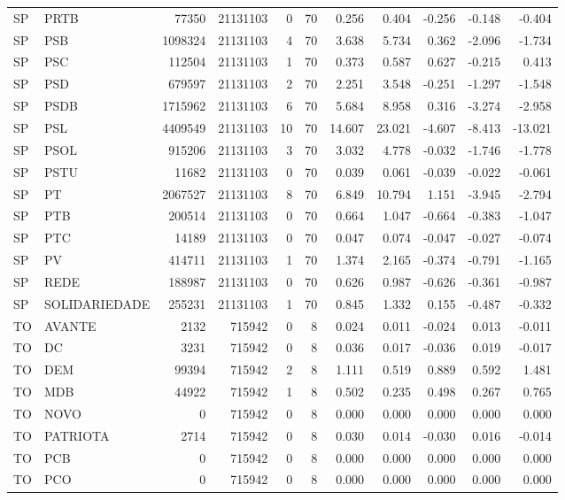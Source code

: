 \begin{landscape}
\begin{longtable}{llrrrrrrrrr}
SP & PRTB & 77350 & 21131103 & 0 & 70 & 0.256 & 0.404 & -0.256 & -0.148 & -0.404 \\
SP & PSB & 1098324 & 21131103 & 4 & 70 & 3.638 & 5.734 & 0.362 & -2.096 & -1.734 \\
SP & PSC & 112504 & 21131103 & 1 & 70 & 0.373 & 0.587 & 0.627 & -0.215 & 0.413 \\
SP & PSD & 679597 & 21131103 & 2 & 70 & 2.251 & 3.548 & -0.251 & -1.297 & -1.548 \\
SP & PSDB & 1715962 & 21131103 & 6 & 70 & 5.684 & 8.958 & 0.316 & -3.274 & -2.958 \\
SP & PSL & 4409549 & 21131103 & 10 & 70 & 14.607 & 23.021 & -4.607 & -8.413 & -13.021 \\
SP & PSOL & 915206 & 21131103 & 3 & 70 & 3.032 & 4.778 & -0.032 & -1.746 & -1.778 \\
SP & PSTU & 11682 & 21131103 & 0 & 70 & 0.039 & 0.061 & -0.039 & -0.022 & -0.061 \\
SP & PT & 2067527 & 21131103 & 8 & 70 & 6.849 & 10.794 & 1.151 & -3.945 & -2.794 \\
SP & PTB & 200514 & 21131103 & 0 & 70 & 0.664 & 1.047 & -0.664 & -0.383 & -1.047 \\
SP & PTC & 14189 & 21131103 & 0 & 70 & 0.047 & 0.074 & -0.047 & -0.027 & -0.074 \\
SP & PV & 414711 & 21131103 & 1 & 70 & 1.374 & 2.165 & -0.374 & -0.791 & -1.165 \\
SP & REDE & 188987 & 21131103 & 0 & 70 & 0.626 & 0.987 & -0.626 & -0.361 & -0.987 \\
SP & SOLIDARIEDADE & 255231 & 21131103 & 1 & 70 & 0.845 & 1.332 & 0.155 & -0.487 & -0.332 \\
TO & AVANTE & 2132 & 715942 & 0 & 8 & 0.024 & 0.011 & -0.024 & 0.013 & -0.011 \\
TO & DC & 3231 & 715942 & 0 & 8 & 0.036 & 0.017 & -0.036 & 0.019 & -0.017 \\
TO & DEM & 99394 & 715942 & 2 & 8 & 1.111 & 0.519 & 0.889 & 0.592 & 1.481 \\
TO & MDB & 44922 & 715942 & 1 & 8 & 0.502 & 0.235 & 0.498 & 0.267 & 0.765 \\
TO & NOVO & 0 & 715942 & 0 & 8 & 0.000 & 0.000 & 0.000 & 0.000 & 0.000 \\
TO & PATRIOTA & 2714 & 715942 & 0 & 8 & 0.030 & 0.014 & -0.030 & 0.016 & -0.014 \\
TO & PCB & 0 & 715942 & 0 & 8 & 0.000 & 0.000 & 0.000 & 0.000 & 0.000 \\
TO & PCO & 0 & 715942 & 0 & 8 & 0.000 & 0.000 & 0.000 & 0.000 & 0.000 \\

\end{longtable}
\end{landscape}
